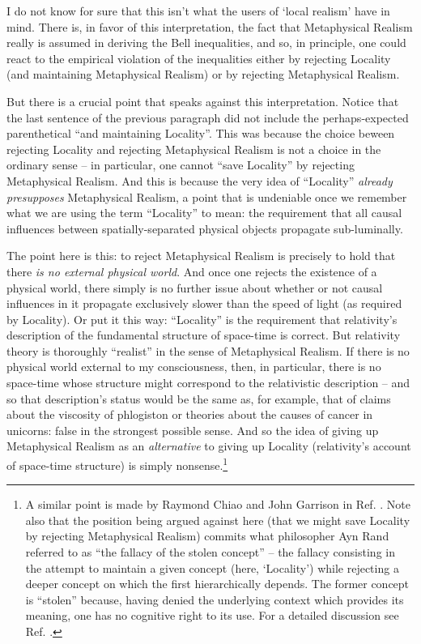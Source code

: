 \documentclass[12pt]{article}
\begin{document}
I do not know for sure that this isn't what the users of `local
realism' have in mind.  There is, in favor of this interpretation,
the fact that Metaphysical Realism really is assumed in deriving the
Bell inequalities, and so, in principle, one could react to the
empirical violation of the inequalities either by rejecting Locality
(and maintaining Metaphysical Realism) or by rejecting Metaphysical
Realism.  

But there is a crucial point that speaks against this interpretation.
Notice that the last sentence of the previous paragraph did not
include the perhaps-expected parenthetical ``and maintaining
Locality''.  This was because the choice beween rejecting Locality and 
rejecting Metaphysical Realism is not a choice in the ordinary sense
-- in particular, one cannot ``save Locality'' by rejecting
Metaphysical Realism.  And this is because the very idea of ``Locality''
\emph{already presupposes} Metaphysical Realism, a point that is undeniable
once we remember what we are using the term ``Locality'' to mean:  the
requirement that all causal influences between spatially-separated
physical objects propagate sub-luminally.

The point here is this:  to reject Metaphysical Realism is precisely
to hold that there \emph{is no external physical world}.  And once one rejects
the existence of a physical world, there simply is no further issue
about whether or not causal influences in it propagate exclusively
slower than the speed of light (as required by Locality).  Or put it
this way:  ``Locality'' is the requirement that relativity's
description of the fundamental structure of space-time is correct.
But relativity theory is
thoroughly ``realist'' in the sense of Metaphysical Realism.  If there
is no physical world external to my consciousness, then, in
particular, there is no space-time whose structure might correspond to
the relativistic description -- and so that description's status would
be the same as, for example, that of claims about the viscosity of phlogiston
or theories about the causes of cancer in 
unicorns:  false in the strongest possible sense.
And so the idea of giving up
Metaphysical Realism as an \emph{alternative} to giving up Locality
(relativity's account of space-time structure) is simply
nonsense.\footnote{A 
similar point is made by Raymond Chiao and John Garrison
  in Ref. \cite{chiao}.  Note also that the position being
  argued against here (that we might save Locality by rejecting
  Metaphysical Realism) commits what philosopher Ayn Rand referred to as
  ``the fallacy of the stolen concept'' -- the fallacy consisting in
  the attempt to maintain a given concept (here, `Locality') while
  rejecting a deeper concept on which the first hierarchically depends.
  The former concept is ``stolen'' because, having denied the
  underlying context which provides its meaning, one has no cognitive
  right to its use.  For a detailed discussion see
  Ref. \cite{peikoff}.}
\end{document}
